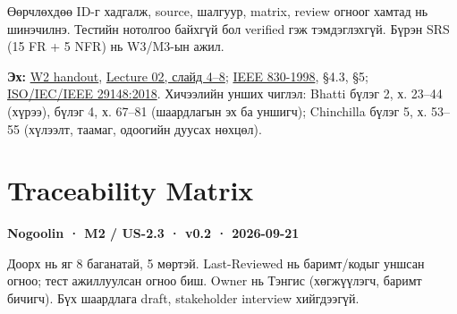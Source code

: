 \documentclass[
  11pt,
  a4paper,
]{article}
\begin{document}
Өөрчлөхдөө ID-г хадгалж, source, шалгуур, matrix, review огноог хамтад
нь шинэчилнэ. Тестийн нотолгоо байхгүй бол verified гэж тэмдэглэхгүй.
Бүрэн SRS (15 FR + 5 NFR) нь W3/M3-ын ажил.

\textbf{Эх:}
\href{Software_Project_Documentation_Week_02_Handout.pdf}{W2 handout},
\href{../lecture/Lecture_02\%20Why\%20Documentation\%20Documentation\%20Standards.pdf}{Lecture
02, слайд 4--8};
\href{https://www.math.uaa.alaska.edu/~afkjm/cs401/IEEE830.pdf}{IEEE
830-1998}, §4.3, §5;
\href{https://standards.ieee.org/ieee/29148/6937/}{ISO/IEC/IEEE
29148:2018}. Хичээлийн унших чиглэл: Bhatti бүлэг 2, х. 23--44 (хүрээ),
бүлэг 4, х. 67--81 (шаардлагын эх ба уншигч); Chinchilla бүлэг 5, х.
53--55 (хүлээлт, таамаг, одоогийн дуусах нөхцөл).

\clearpage
\begingroup\footnotesize\setlength{\tabcolsep}{2pt}
\section{Traceability Matrix}\label{doc5-traceability-matrix}

\textbf{Nogoolin · M2 / US-2.3 · v0.2 · 2026-09-21}

Доорх нь яг 8 баганатай, 5 мөртэй. Last-Reviewed нь баримт/кодыг уншсан
огноо; тест ажиллуулсан огноо биш. Owner нь Тэнгис (хөгжүүлэгч, баримт
бичигч). Бүх шаардлага draft, stakeholder interview хийгдээгүй.
\end{document}
